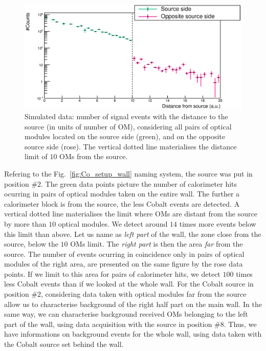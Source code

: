 \begin{figure}[h]
  \centering
  \includegraphics[width=17cm]{commissioning/fig_commissioning/Co_simus_bkg.eps}
  \caption{Simulated data: number of signal events with the distance to the source (in units of number of OM), considering all pairs of optical modules located on the source side (green), and on the opposite source side (rose).
    The vertical dotted line materialises the distance limit of $10$ OMs from the source.
    \label{fig:Co_simus_bkg}}
\end{figure}
Refering to the Fig.~\ref{fig:Co_setup_wall} naming system, the source was put in position $\#2$.
The green data points picture the number of calorimeter hits ocurring in pairs of optical modules taken on the entire wall.
The further a calorimeter block is from the source, the less Cobalt events are detected.
A vertical dotted line materialises the limit where OMs are distant from the source by more than $10$ optical modules.
We detect around $14$ times more events below this limit than above.
Let us name as \emph{left part} of the wall, the zone close from the source, below the $10$ OMs limit.
The \emph{right part} is then the area \emph{far} from the source.
The number of events ocurring in coincidence only in pairs of optical modules of the right area, are presented on the same figure by the rose data points.
If we limit to this area for pairs of calorimeter hits, we detect $100$ times less Cobalt events than if we looked at the whole wall.
For the Cobalt source in position $\#2$, considering data taken with optical modules far from the source allow us to characterise background of the right half part on the main wall.
In the same way, we can characterise background received OMs belonging to the left part of the wall, using data acquisition with the source in position $\#8$.
Thus, we have informations on background events for the whole wall, using data taken with the Cobalt source set behind the wall.\\
